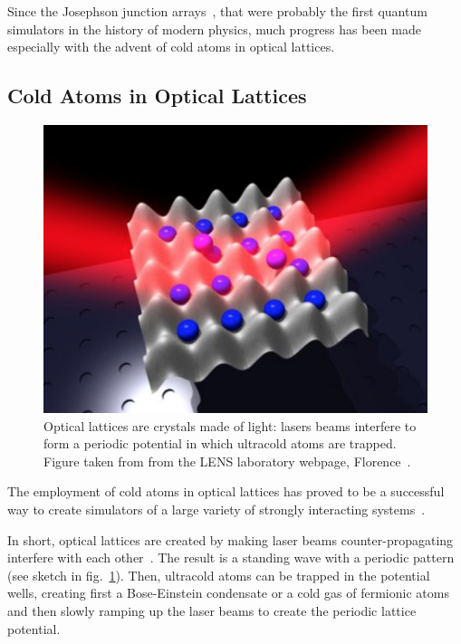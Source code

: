 Since the Josephson junction arrays~\cite{josephsonArrays}, that were probably the first quantum simulators in the history of modern physics, much progress has been made especially with the advent of cold atoms in optical lattices.

\subsection{Cold Atoms in Optical Lattices}
\begin{figure}
    \centering
    \includegraphics[scale=0.7]{Figures/optical_lattice.png}
    \captionsetup{width=1.\linewidth}
    \caption{Optical lattices are crystals made of light: lasers beams interfere to form a periodic potential in which ultracold atoms are trapped. Figure taken from from the LENS laboratory webpage, Florence~\cite{LENS_Florence}.}
    \label{fig:optical_lattice}
\end{figure}

The employment of cold atoms in optical lattices has proved to be a successful way to create simulators of a large variety of strongly interacting systems~\cite{ultracoldAtoms_condMatter}. 

In short, optical lattices are created by making laser beams counter-propa\-gating interfere with each other~\cite{optical_lattice_interview}. The result is a standing wave with a periodic pattern (see sketch in fig.~\ref{fig:optical_lattice}). Then, ultracold atoms can be trapped in the potential wells, creating first a Bose-Einstein condensate or a cold gas of fermionic atoms and then slowly ramping up the laser beams to create the periodic lattice potential. 

